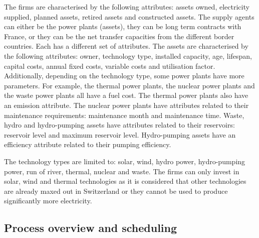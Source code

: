 
The firms are characterised by the following attributes: assets owned, electricity supplied, planned assets, retired assets and constructed assets. The supply agents can either be the power plants (assets), they can be long term contracts with France, or they can be the net transfer capacities from the different border countries. Each has a different set of attributes. The assets are characterised by the following attributes: owner, technology type, installed capacity, age, lifespan, capital costs, annual fixed costs, variable costs and utilisation factor. Additionally, depending on the technology type, some power plants have more parameters. For example, the thermal power plants, the nuclear power plants and the waste power plants all have a fuel cost. The thermal power plants also have an emission attribute. The nuclear power plants have attributes related to their maintenance requirements: maintenance month and maintenance time. Waste, hydro and hydro-pumping assets have attributes related to their reservoirs: reservoir level and maximum reservoir level. Hydro-pumping assets have an efficiency attribute related to their pumping efficiency.

The technology types are limited to: solar, wind, hydro power, hydro-pumping power, run of river, thermal, nuclear and waste. The firms can only invest in solar, wind and thermal technologies as it is considered that other technologies are already maxed out in Switzerland or they cannot be used to produce significantly more electricity.



\subsection{Process overview and scheduling}
\label{ssec:process}

